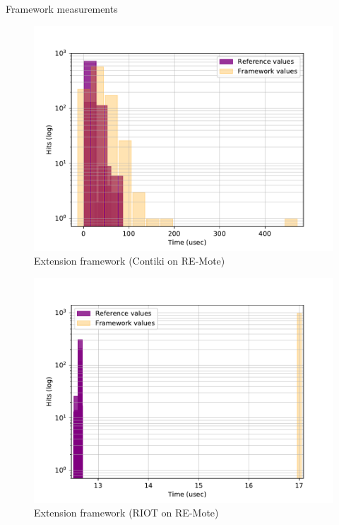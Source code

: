\documentclass{beamer}
\begin{document}
\begin{frame}{Framework measurements}
  \protect\hypertarget{framework-measurements}{}
  \begin{figure}
    \includegraphics[scale=0.4]{assets/comparison-extension-framework-contiki-remote.pdf}
    \caption{Extension framework (Contiki on RE-Mote)}
  \end{figure}
\end{frame}

\begin{frame}
  \begin{figure}
    \includegraphics[scale=0.4]{assets/comparison-extension-framework-riot-remote.pdf}
    \caption{Extension framework (RIOT on RE-Mote)}
  \end{figure}
\end{frame}
\end{document}
